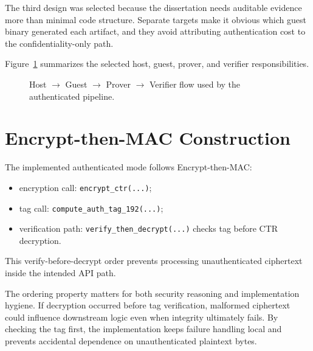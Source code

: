 The third design was selected because the dissertation needs auditable evidence
more than minimal code structure. Separate targets make it obvious which guest
binary generated each artifact, and they avoid attributing authentication cost to
the confidentiality-only path.

Figure~\ref{fig:host-guest-prover-verifier-flow} summarizes the selected host,
guest, prover, and verifier responsibilities.

\begin{figure}[t]
\centering
{}
\caption{Host $\rightarrow$ Guest $\rightarrow$ Prover $\rightarrow$ Verifier flow used by the authenticated pipeline.}
\label{fig:host-guest-prover-verifier-flow}
\end{figure}

\section{Encrypt-then-MAC Construction}

The implemented authenticated mode follows Encrypt-then-MAC:

\begin{itemize}
\item encryption call: \texttt{encrypt\_ctr(...)};
\item tag call: \texttt{compute\_auth\_tag\_192(...)};
\item verification path: \texttt{verify\_then\_decrypt(...)} checks tag before
CTR decryption.
\end{itemize}

This verify-before-decrypt order prevents processing unauthenticated ciphertext
inside the intended API path.

The ordering property matters for both security reasoning and implementation
hygiene. If decryption occurred before tag verification, malformed ciphertext
could influence downstream logic even when integrity ultimately fails. By
checking the tag first, the implementation keeps failure handling local and
prevents accidental dependence on unauthenticated plaintext bytes.

